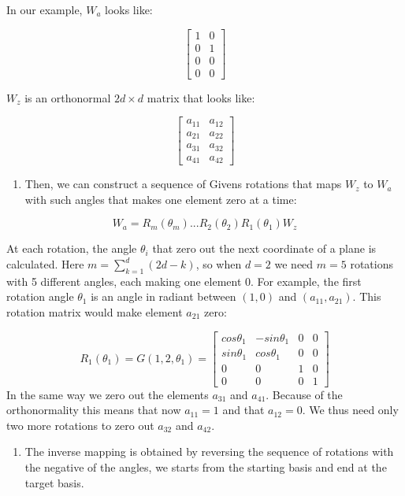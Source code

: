 In our example, \(W_a\) looks like:

\[ \begin{bmatrix}1 & 0 \\0  &1 \\ 0&0 \\0&0\end{bmatrix} \]

\(W_z\) is an orthonormal \(2d\times d\) matrix that looks like:

\[ \begin{bmatrix} a_{11} & a_{12} \\a_{21}  &a_{22} \\ a_{31}&a_{32} \\a_{41}&a_{42}\end{bmatrix} \]

\begin{enumerate}
\def\labelenumi{\arabic{enumi}.}
\setcounter{enumi}{2}
\tightlist
\item
  Then, we can construct a sequence of Givens rotations that maps
  \(W_z\) to \(W_a\) with such angles that makes one element zero at a
  time:
\end{enumerate}

\[ W_a = R_m(\theta_m) ... R_2(\theta_2)R_1(\theta_1)W_z\]

At each rotation, the angle \(\theta_i\) that zero out the next
coordinate of a plane is calculated. Here \(m = \sum_{k=1}^d (2d - k)\),
so when \(d=2\) we need \(m=5\) rotations with 5 different angles, each
making one element 0. For example, the first rotation angle \(\theta_1\)
is an angle in radiant between \((1, 0)\) and \((a_{11}, a_{21})\). This
rotation matrix would make element \(a_{21}\) zero:

\[R_1(\theta_1) = G(1, 2, \theta_1) = \begin{bmatrix} cos\theta_1 & -sin\theta_1 & 0 & 0 \\sin\theta_1  &cos\theta_1 & 0 &0 \\ 0&0&1&0 \\0&0&0&1\end{bmatrix}\]
In the same way we zero out the elements \(a_{31}\) and \(a_{41}\).
Because of the orthonormality this means that now \(a_{11} = 1\) and
that \(a_{12} = 0\). We thus need only two more rotations to zero out
\(a_{32}\) and \(a_{42}\).

\begin{enumerate}
\def\labelenumi{\arabic{enumi}.}
\setcounter{enumi}{3}
\tightlist
\item
  The inverse mapping is obtained by reversing the sequence of rotations
  with the negative of the angles, we starts from the starting basis and
  end at the target basis.
\end{enumerate}

